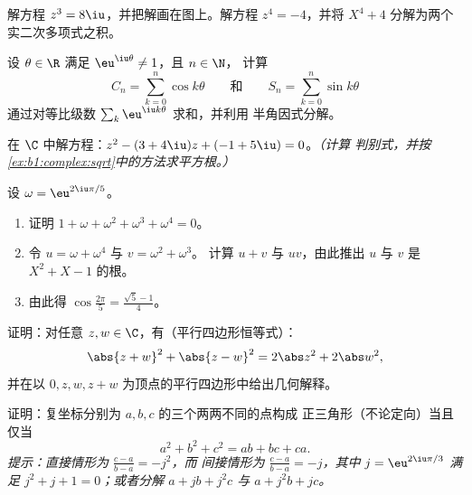 \begin{exercise}[$\star$]\label{exo:b1:complex:5}
解方程 $z^3 = 8\iu$，并把解画在图上。解方程
$z^4 = -4$，并将 $X^4 + 4$ 分解为两个实二次多项式之积。
\end{exercise}

\begin{exercise}[$\star\star$]\label{exo:b1:complex:6}
设 $\theta \in \R$ 满足 $\eu^{\iu\theta} \neq 1$，且 $n \in \N$，
计算
\[
C_n = \sum_{k=0}^{n} \cos k\theta
\qquad\text{和}\qquad
S_n = \sum_{k=0}^{n} \sin k\theta
\]
通过对等比级数 $\sum_k \eu^{\iu k\theta}$ 求和，并利用
半角因式分解。
\end{exercise}

\begin{exercise}[$\star\star$]\label{exo:b1:complex:7}
在 $\C$ 中解方程：$z^2 - (3 + 4\iu) z + (-1 + 5\iu) = 0$。\emph{（计算
判别式，并按
\cref{ex:b1:complex:sqrt}中的方法求平方根。）}
\end{exercise}

\begin{exercise}[$\star\star$]\label{exo:b1:complex:8}
设 $\omega = \eu^{2\iu\pi/5}$。
\begin{enumerate}
  \item 证明 $1 + \omega + \omega^2 + \omega^3 + \omega^4 = 0$。
  \item 令 $u = \omega + \omega^4$ 与 $v = \omega^2 + \omega^3$。
        计算 $u + v$ 与 $uv$，由此推出 $u$ 与 $v$ 是
        $X^2 + X - 1$ 的根。
  \item 由此得 $\cos\frac{2\pi}{5} = \frac{\sqrt 5 - 1}{4}$。
\end{enumerate}
\end{exercise}

\begin{exercise}[$\star\star$]\label{exo:b1:complex:9}
证明：对任意 $z, w \in \C$，有（平行四边形恒等式）：
\[
\abs{z + w}^2 + \abs{z - w}^2 = 2\abs z^2 + 2\abs w^2 ,
\]
并在以 $0,
z, w, z + w$ 为顶点的平行四边形中给出几何解释。
\end{exercise}

\begin{exercise}[$\star\star\star$]\label{exo:b1:complex:10}
证明：复坐标分别为 $a, b, c$ 的三个两两不同的点构成
正三角形（不论定向）当且仅当
\[
a^2 + b^2 + c^2 = ab + bc + ca .
\]
\emph{提示：直接情形为 $\frac{c-a}{b-a} = -j^2$，而
间接情形为 $\frac{c-a}{b-a} = -j$，其中 $j = \eu^{2\iu\pi/3}$
满足 $j^2 + j + 1 = 0$；或者分解 $a + jb + j^2c$ 与 $a + j^2 b
+ jc$。}
\end{exercise}

